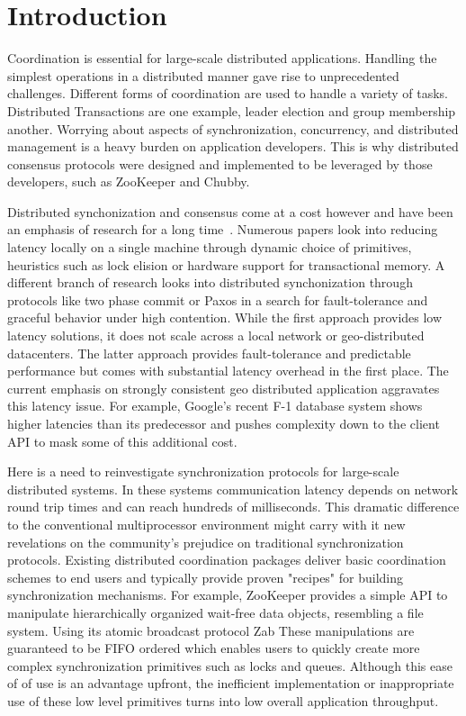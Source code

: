 \section{Introduction}\label{sec:intro}

Coordination is essential for large-scale distributed applications. Handling the simplest operations in a distributed manner gave rise to unprecedented challenges. Different forms of coordination are used to handle a variety of tasks. Distributed Transactions are one example, leader election and group membership another. Worrying about aspects of synchronization, concurrency, and distributed management is a heavy burden on application developers. This is why distributed consensus protocols were designed and implemented to be leveraged by those developers, such as ZooKeeper\cite{zookeeper} and Chubby\cite{chubby}.

Distributed synchonization and consensus come at a cost however and have been an emphasis of research for a long time~\cite{reactive}. Numerous papers look into reducing latency locally on a single machine through dynamic choice of primitives\cite{reactive}, heuristics such as lock elision\cite{lock_elision} or hardware support for transactional memory\cite{transactional_memory}. A different branch of research looks into distributed synchonization through protocols like two phase commit\cite{two_phase_commit} or Paxos\cite{paxos} in a search for fault-tolerance and graceful behavior under high contention. While the first approach provides low latency solutions, it does not scale across a local network or geo-distributed datacenters. The latter approach provides fault-tolerance and predictable performance but comes with substantial latency overhead in the first place. The current emphasis on strongly consistent geo distributed application aggravates this latency issue. For example, Google's recent F-1 database system \cite{google_f1} shows higher latencies than its predecessor and pushes complexity down to the client API to mask some of this additional cost.

Here is a need to reinvestigate synchronization protocols for large-scale distributed systems. In these systems communication latency depends on network round trip times and can reach hundreds of milliseconds. This dramatic difference to the conventional multiprocessor environment might carry with it new revelations on the community's prejudice on traditional synchronization protocols. Existing distributed coordination packages deliver basic coordination schemes to end users and typically provide proven "recipes" \cite{zookeeper_recipes} for building synchronization mechanisms. For example, ZooKeeper provides a simple API to manipulate hierarchically organized wait-free data objects, resembling a file system. Using its atomic broadcast protocol Zab\cite{ZAB} These manipulations are guaranteed to be FIFO ordered which enables users to quickly create more complex synchronization primitives such as locks and queues. Although this ease of of use is an advantage upfront, the inefficient implementation or inappropriate use of these low level primitives turns into low overall application throughput.

